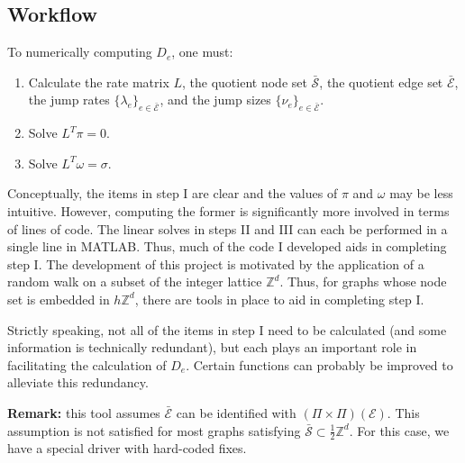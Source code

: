 \documentclass[11pt, oneside]{article}   	%
\theoremstyle{definition}
\newcommand\sS{\mathcal{S}}
\newcommand\sE{\mathcal{E}}
\newcommand{\integ}{{\mathbb Z}}
\newcommand\oS{\bar{\sS}}
\newcommand\oE{\bar{\sE}}
\begin{document}
\subsection{Workflow}
To numerically computing $D_e$, one must:
\begin{enumerate}[I]
	\item Calculate the rate matrix $L$, the quotient node set $\oS$, the quotient edge set $\oE$, the jump rates $\{\lambda_e\}_{e \in \oE}$, and the jump sizes $\{\nu_e\}_{e \in \oE}$.
	\item Solve $L^T \pi = 0$.
	\item Solve $L^T \omega = \sigma$.
\end{enumerate}
Conceptually, the items in step I are clear and the values of $\pi$ and $\omega$ may be less intuitive. However, computing the former is significantly more involved in terms of lines of code. The linear solves in steps II and III can each be performed in a single line in MATLAB. Thus, much of the code I developed aids in completing step I. The development of this project is motivated by the application of a random walk on a subset of the integer lattice $\integ^d$. Thus, for graphs whose node set is embedded in $h \integ^d$, there are tools in place to aid in completing step I.

Strictly speaking, not all of the items in step I need to be calculated (and some information is technically redundant), but each plays an important role in facilitating the calculation of $D_e$. Certain functions can probably be improved to alleviate this redundancy.

{\bf Remark:} this tool assumes $\oE$ can be identified with $(\Pi \times \Pi)(\sE)$. This assumption is not satisfied for most graphs satisfying $\oS \subset \frac{1}{2} \integ^d$. For this case, we have a special driver with hard-coded fixes.
\end{document}
